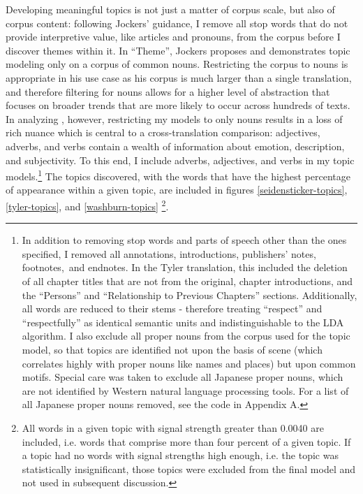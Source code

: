 \documentclass[12pt]{article}
\begin{document}
\begin{flushleft}
\begin{spacing}{2.0}
Developing meaningful topics is not just a matter of corpus scale, but also of corpus content: following Jockers' guidance, I remove all stop words that do not provide interpretive value, like articles and pronouns, from the corpus before I discover themes within it. In ``Theme'', Jockers proposes and demonstrates topic modeling only on a corpus of common nouns. Restricting the corpus to nouns is appropriate in his use case as his corpus is much larger than a single  translation, and therefore filtering for nouns allows for a higher level of abstraction that focuses on broader trends that are more likely to occur across hundreds of texts. In analyzing , however, restricting my models to only nouns results in a loss of rich nuance which is central to a cross-translation comparison: adjectives, adverbs, and verbs contain a wealth of information about emotion, description, and subjectivity. To this end, I include adverbs, adjectives, and verbs in my topic models.\footnote{ In addition to removing stop words and parts of speech other than the ones specified, I removed all annotations, introductions, publishers' notes, footnotes, and endnotes. In the Tyler translation, this included the deletion of all chapter titles that are not from the original, chapter introductions, and the ``Persons'' and ``Relationship to Previous Chapters'' sections. Additionally, all words are reduced to their stems - therefore treating ``respect'' and ``respectfully'' as identical semantic units and indistinguishable to the LDA algorithm. I also exclude all proper nouns from the corpus used for the topic model, so that topics are identified not upon the basis of scene (which correlates highly with proper nouns like names and places) but upon common motifs. Special care was taken to exclude all Japanese proper nouns, which are not identified by Western natural language processing tools. For a list of all Japanese proper nouns removed, see the code in Appendix A.} The topics discovered, with the words that have the highest percentage of appearance within a given topic, are included in figures \ref{seidensticker-topics}, \ref{tyler-topics}, and \ref{washburn-topics} \footnote{All words in a given topic with signal strength greater than 0.0040 are included, i.e. words that comprise more than four percent of a given topic. If a topic had no words with signal strengths high enough, i.e. the topic was statistically insignificant, those topics were excluded from the final model and not used in subsequent discussion.}.


\end{spacing}
\end{flushleft}
\end{document}
